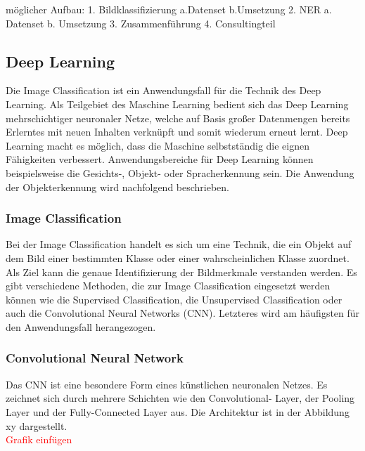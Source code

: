 möglicher Aufbau:
1.	Bildklassifizierung
a.Datenset
b.Umsetzung
2.	NER
a.	Datenset
b.	Umsetzung
3.	Zusammenführung
4.	Consultingteil

\subsection{Deep Learning}

Die Image Classification ist ein Anwendungsfall für die Technik des Deep Learning.
Als Teilgebiet des Maschine Learning bedient sich das Deep Learning mehrschichtiger neuronaler Netze, welche auf Basis großer Datenmengen bereits Erlerntes mit neuen Inhalten verknüpft und somit wiederum erneut lernt. Deep Learning macht es möglich, dass die Maschine selbstständig die eignen Fähigkeiten verbessert.
Anwendungsbereiche für Deep Learning können beispielsweise die Gesichts-, Objekt- oder Spracherkennung sein. Die Anwendung der Objekterkennung wird nachfolgend beschrieben.

\subsubsection{Image Classification}
Bei der Image Classification handelt es sich um eine Technik, die ein Objekt auf dem Bild einer bestimmten Klasse oder einer wahrscheinlichen Klasse zuordnet. Als Ziel kann die genaue Identifizierung der Bildmerkmale verstanden werden.
Es gibt verschiedene Methoden, die zur Image Classification eingesetzt werden können wie die Supervised Classification, die Unsupervised Classification oder auch die Convolutional Neural Networks (CNN). Letzteres wird am häufigsten für den Anwendungsfall herangezogen.

\subsubsection{Convolutional Neural Network}
Das CNN ist eine besondere Form eines künstlichen neuronalen Netzes.
Es zeichnet sich durch mehrere Schichten wie den Convolutional- Layer, der Pooling Layer und der Fully-Connected Layer aus. Die Architektur ist in der Abbildung xy dargestellt.
\\
\textcolor{red}{Grafik einfügen} \\

